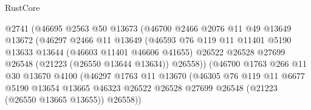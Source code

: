 \begin{lexlean}{RustCore}
\begin{coremodule}
                                @2741
                                (@46695
                                  @2563
                                  @50
                                  @13673
                                  (@46700
                                    @2466
                                    @2076
                                    @11
                                    @49
                                    @13649
                                    @13672
                                    (@46297
                                      @2466
                                      @11
                                      @13649
                                      (@46593
                                        @76
                                        @119
                                        @11
                                        @11401
                                        @5190
                                        @13633
                                        @13644
                                        (@46603 @11401 @46606 @41655)
                                        @26522
                                        @26528
                                        @27699
                                        @26548
                                        (@21223 (@26550 @13644 @13634))
                                        @26558))
                                    (@46700
                                      @1763
                                      @266
                                      @11
                                      @30
                                      @13670
                                      @4100
                                      (@46297
                                        @1763
                                        @11
                                        @13670
                                        (@46305
                                          @76
                                          @119
                                          @11
                                          @6677
                                          @5190
                                          @13654
                                          @13665
                                          @46323
                                          @26522
                                          @26528
                                          @27699
                                          @26548
                                          (@21223 (@26550 @13665 @13655))
                                          @26558))

\end{coremodule}
\end{lexlean}
